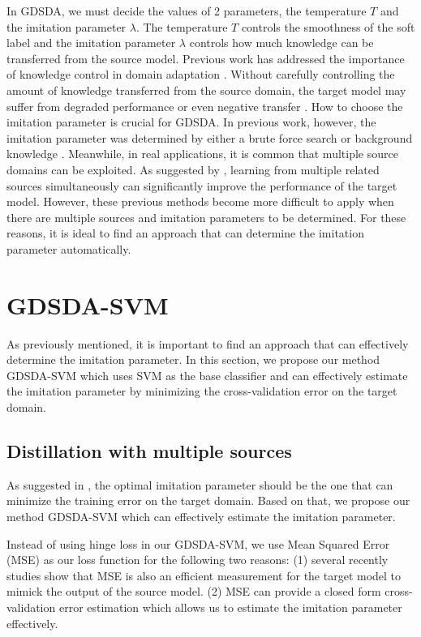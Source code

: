 In GDSDA, we must decide the values of 2 parameters, the temperature $T$ and the imitation parameter $\lambda$. The temperature $T$ controls the smoothness of the soft label and the imitation parameter $\lambda$ controls how much knowledge can be transferred from the source model. Previous work has addressed the importance of knowledge control in domain adaptation \cite{duan2012learning,duan2012visual}. Without carefully controlling the amount of knowledge transferred from the source domain, the target model may suffer from degraded performance or even negative transfer \cite{pan2010survey}.
How to choose the imitation parameter is crucial for GDSDA. In previous work, however, the imitation parameter was determined by either a brute force search \cite{lopez2015unifying} or background knowledge \cite{Tzeng_2015_ICCV}. Meanwhile, in real applications, it is common that  multiple source domains can be exploited. As suggested by \cite{tommasi2014learning}, learning from multiple related sources simultaneously can significantly improve the performance of the target model. However, these previous methods become more difficult to apply when there are multiple sources and imitation parameters to be determined.
For these reasons, it is ideal to find an approach that can determine the imitation parameter automatically.

\section{GDSDA-SVM}\label{sec:aaai:svm}
As previously mentioned, it is important to find an approach that can effectively determine the imitation parameter. In this section, we propose our method GDSDA-SVM which uses SVM as the base classifier and can effectively estimate the imitation parameter by minimizing the cross-validation error on the target domain.
\subsection{Distillation with multiple sources}
As suggested in \cite{vapnik2015learning}, the optimal imitation parameter should be the one that can minimize the training error on the target domain. Based on that, we propose our method GDSDA-SVM which can effectively estimate the imitation parameter.

Instead of using hinge loss in our GDSDA-SVM, we use Mean Squared Error (MSE) as our loss function for the following two reasons: (1) several recently studies \cite{ba2014deep,luo2016face,romero2014fitnets,urban2016deep} show that MSE is also an efficient measurement for the target model to mimick the output of the source model. (2) MSE can provide a closed form cross-validation error estimation which allows us to estimate the imitation parameter effectively. 

